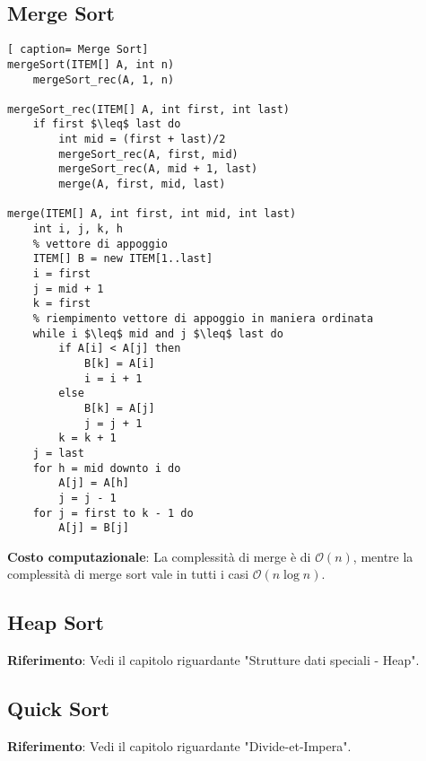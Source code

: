 \documentclass[../cheatSheetAlgoritmi.tex]{subfiles}
\begin{document}
\subsection{Merge Sort}
\begin{lstlisting}[ caption= Merge Sort]
mergeSort(ITEM[] A, int n)
	mergeSort_rec(A, 1, n)

mergeSort_rec(ITEM[] A, int first, int last)
  	if first $\leq$ last do
		int mid = (first + last)/2
		mergeSort_rec(A, first, mid)
		mergeSort_rec(A, mid + 1, last)
		merge(A, first, mid, last)

merge(ITEM[] A, int first, int mid, int last)
  	int i, j, k, h
  	% vettore di appoggio
  	ITEM[] B = new ITEM[1..last]
  	i = first
  	j = mid + 1
  	k = first
  	% riempimento vettore di appoggio in maniera ordinata
  	while i $\leq$ mid and j $\leq$ last do
		if A[i] < A[j] then
			B[k] = A[i]
			i = i + 1
		else  
			B[k] = A[j]
			j = j + 1
		k = k + 1
	j = last
  	for h = mid downto i do
  		A[j] = A[h]
  		j = j - 1
  	for j = first to k - 1 do
  		A[j] = B[j]
\end{lstlisting}
\textbf{Costo computazionale}: La complessità di merge è di $\mathcal{O}(n)$, mentre la complessità di merge sort vale in tutti i casi $\mathcal{O}(n\log{}n)$.\

\subsection{Heap Sort}
\textbf{Riferimento}: Vedi il capitolo riguardante "Strutture dati speciali - Heap".\

\subsection{Quick Sort}
\textbf{Riferimento}: Vedi il capitolo riguardante "Divide-et-Impera".\

\newpage
\end{document}
